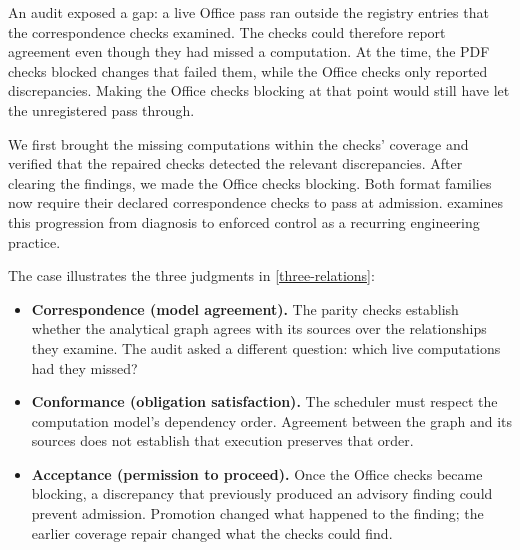 An audit exposed a gap: a live Office pass ran outside the registry entries that the correspondence checks examined. The checks could therefore report agreement even though they had missed a computation. At the time, the PDF checks blocked changes that failed them, while the Office checks only reported discrepancies. Making the Office checks blocking at that point would still have let the unregistered pass through.

We first brought the missing computations within the checks' coverage and verified that the repaired checks detected the relevant discrepancies. After clearing the findings, we made the Office checks blocking. Both format families now require their declared correspondence checks to pass at admission.  examines this progression from diagnosis to enforced control as a recurring engineering practice.

The case illustrates the three judgments in \autoref{three-relations}:
\begin{itemize}
\item \textbf{Correspondence (model agreement).} The parity checks establish whether the analytical graph agrees with its sources over the relationships they examine. The audit asked a different question: which live computations had they missed?
\item \textbf{Conformance (obligation satisfaction).} The scheduler must respect the computation model's dependency order. Agreement between the graph and its sources does not establish that execution preserves that order.
\item \textbf{Acceptance (permission to proceed).} Once the Office checks became blocking, a discrepancy that previously produced an advisory finding could prevent admission. Promotion changed what happened to the finding; the earlier coverage repair changed what the checks could find.
\end{itemize}

